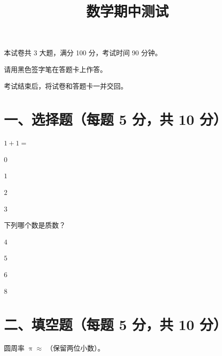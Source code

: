 \documentclass{exam-zh}
\begin{document}
\title{数学期中测试}
\subject{数学}
\maketitle


\begin{notice}
  \item 本试卷共 3 大题，满分 100 分，考试时间 90 分钟。
  \item 请用黑色签字笔在答题卡上作答。
  \item 考试结束后，将试卷和答题卡一并交回。
\end{notice}

\vspace{1em}

\section*{一、选择题（每题 5 分，共 10 分）}

\begin{question}
  $1 + 1 = $ \paren[C]
  \begin{choices}
    \item $0$
    \item $1$
    \item $2$   %
    \item $3$
  \end{choices}
\end{question}

\begin{question}
  下列哪个数是质数？\paren[B]
  \begin{choices}
    \item $4$
    \item $5$   %
    \item $6$
    \item $8$
  \end{choices}
\end{question}


\section*{二、填空题（每题 5 分，共 10 分）}

\begin{question}
  圆周率 $\uppi \approx$ \fillin[3.14]（保留两位小数）。
\end{question}
\end{document}
